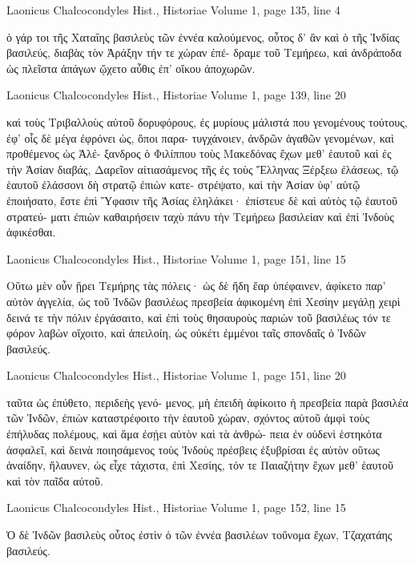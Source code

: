 \documentclass[12pt,letterpaper,twoside,final]{memoir}
\begin{document}
\begin{greek}
Laonicus Chalcocondyles Hist., Historiae 
Volume 1, page 135, line 4

                                                        ὁ γάρ τοι 
τῆς Χαταΐης βασιλεὺς τῶν ἐννέα καλούμενος, οὗτος δ' ἂν καὶ 
ὁ τῆς Ἰνδίας βασιλεύς, διαβὰς τὸν Ἀράξην τήν τε χώραν ἐπέ-
δραμε τοῦ Τεμήρεω, καὶ ἀνδράποδα ὡς πλεῖστα ἀπάγων ᾤχετο 
αὖθις ἐπ' οἴκου ἀποχωρῶν. 



Laonicus Chalcocondyles Hist., Historiae 
Volume 1, page 139, line 20

καὶ τοὺς Τριβαλλοὺς αὐτοῦ δορυφόρους, ἐς μυρίους μάλιστά που 
γενομένους τούτους, ἐφ' οἷς δὲ μέγα ἐφρόνει ὡς, ὅποι παρα-
τυγχάνοιεν, ἀνδρῶν ἀγαθῶν γενομένων, καὶ προθέμενος ὡς Ἀλέ-
ξανδρος ὁ Φιλίππου τοὺς Μακεδόνας ἔχων μεθ' ἑαυτοῦ καὶ ἐς 
τὴν Ἀσίαν διαβάς, Δαρεῖον αἰτιασάμενος τῆς ἐς τοὺς Ἕλληνας 
Ξέρξεω ἐλάσεως, τῷ ἑαυτοῦ ἐλάσσονι δὴ στρατῷ ἐπιὼν κατε-
στρέψατο, καὶ τὴν Ἀσίαν ὑφ' αὑτῷ ἐποιήσατο, ἔστε ἐπὶ Ὕφασιν 
τῆς Ἀσίας ἐληλάκει· ἐπίστευε δὲ καὶ αὐτὸς τῷ ἑαυτοῦ στρατεύ-
ματι ἐπιὼν καθαιρήσειν ταχὺ πάνυ τὴν Τεμήρεω βασιλείαν καὶ 
ἐπὶ Ἰνδοὺς ἀφικέσθαι. 



Laonicus Chalcocondyles Hist., Historiae 
Volume 1, page 151, line 15

Οὕτω μὲν οὖν ᾕρει Τεμήρης τὰς πόλεις· ὡς δὲ ἤδη ἔαρ 
ὑπέφαινεν, ἀφίκετο παρ' αὐτὸν ἀγγελία, ὡς τοῦ Ἰνδῶν βασιλέως 
πρεσβεία ἀφικομένη ἐπὶ Χεσίην μεγάλῃ χειρὶ δεινά τε τὴν πόλιν 
ἐργάσαιτο, καὶ ἐπὶ τοὺς θησαυροὺς παριὼν τοῦ βασιλέως τόν τε 
φόρον λαβὼν οἴχοιτο, καὶ ἀπειλοίη, ὡς οὐκέτι ἐμμένοι ταῖς 
σπονδαῖς ὁ Ἰνδῶν βασιλεύς. 



Laonicus Chalcocondyles Hist., Historiae 
Volume 1, page 151, line 20

                                 ταῦτα ὡς ἐπύθετο, περιδεὴς γενό-
μενος, μὴ ἐπειδὴ ἀφίκοιτο ἡ πρεσβεία παρὰ βασιλέα τῶν Ἰνδῶν, 
ἐπιὼν καταστρέφοιτο τὴν ἑαυτοῦ χώραν, σχόντος αὐτοῦ ἀμφὶ   
τοὺς ἐπήλυδας πολέμους, καὶ ἅμα ἐσῄει αὐτὸν καὶ τὰ ἀνθρώ-
πεια ἐν οὐδενὶ ἑστηκότα ἀσφαλεῖ, καὶ δεινὰ ποιησάμενος τοὺς 
Ἰνδοὺς πρέσβεις ἐξυβρίσαι ἐς αὐτὸν οὕτως ἀναίδην, ἤλαυνεν, ὡς 
εἶχε τάχιστα, ἐπὶ Χεσίης, τόν τε Παιαζήτην ἔχων μεθ' ἑαυτοῦ 
καὶ τὸν παῖδα αὐτοῦ. 



Laonicus Chalcocondyles Hist., Historiae 
Volume 1, page 152, line 15

Ὁ δὲ Ἰνδῶν βασιλεὺς οὗτος ἐστὶν ὁ τῶν ἐννέα βασιλέων 
τοὔνομα ἔχων, Τζαχατάης βασιλεύς. 




\end{greek}
\end{document}
